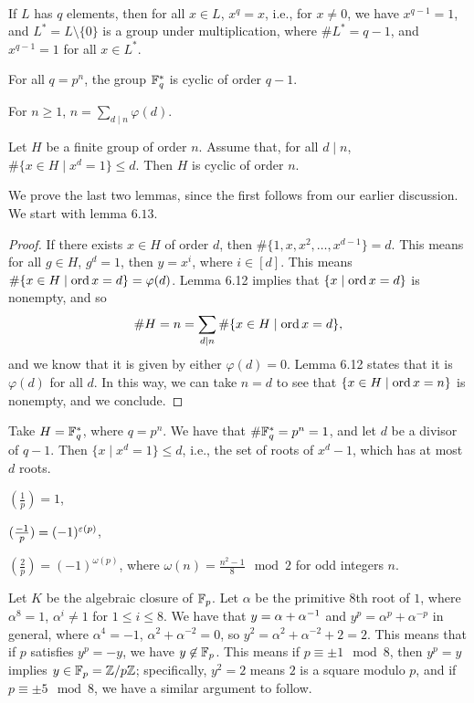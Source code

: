 \\[8pt]
If $L$ has $q$ elements, then for all $x \in L$, $x^q = x$, i.e., for $x \neq 0$, we have $x^{q-1} = 1$, and $L^\ast = L \setminus \{0\}$ is a group under multiplication, where $\# L^\ast = q - 1$, and $x^{q-1} = 1$ for all $x \in L^\ast$.
\begin{lemma}
    For all $q = p^n$, the group $\mathbb F_q^\ast$ is cyclic of order $q - 1$.
\end{lemma}
\begin{lemma}
    For $n \geq 1$, $n = \sum_{d \mid n} \varphi(d)$.
\end{lemma}
\begin{lemma}
    Let $H$ be a finite group of order $n$. Assume that, for all $d \mid n$, $\# \{x \in H \mid x^d = 1\} \leq d$. Then $H$ is cyclic of order $n$.
\end{lemma}
\noindent We prove the last two lemmas, since the first follows from our earlier discussion. We start with lemma $6.13$.
\begin{proof}
    If there exists $x \in H$ of order $d$, then $\#\{1, x, x^2, \dots, x^{d-1}\} = d$. This means for all $g \in H$, $g^d = 1$, then $y = x^i$, where $i \in [d]$. This means $\#\{x \in H \mid \operatorname{ord} x = d\} = \varphi(d)$. Lemma 6.12 implies that $\{x \mid \operatorname{ord} x = d\}$ is nonempty, and so
    \[ \#H = n = \sum_{d \mid n} \#\{x \in H \mid \operatorname{ord} x = d \}, \]
    and we know that it is given by either $\varphi(d) = 0$. Lemma 6.12 states that it is $\varphi(d)$ for all $d$. In this way, we can take $n = d$ to see that $\{x \in H \mid \operatorname{ord} x = n\}$ is nonempty, and we conclude.
\end{proof}
\noindent Take $H = \mathbb F_q^\ast$, where $q = p^n$. We have that $\# \mathbb F_q^\ast = p^n = 1$, and let $d$ be a divisor of $q - 1$. Then $\{x \mid x^d = 1\} \leq d$, i.e., the set of roots of $x^d - 1$, which has at most $d$ roots.
\begin{lemma}
    \begin{parlist}
        \item $(\frac{1}{p}) = 1$,
        \item $(\frac{-1}{p}) = (-1)^{\varepsilon (p)}$,
        \item $(\frac{2}{p}) = (-1)^{\omega (p)}$, where $\omega(n) = \frac{n^2 - 1}{8} \mod 2$ for odd integers $n$. 
    \end{parlist}
\end{lemma}
\noindent Let $K$ be the algebraic closure of $\mathbb F_p$. Let $\alpha$ be the primitive $8$th root of $1$, where $\alpha^8 = 1$, $\alpha^i \neq 1$ for $1 \leq i \leq 8$. We have that $y = \alpha + \alpha^{-1}$ and $y^p = \alpha^p + \alpha^{-p}$ in general, where $\alpha^4 = -1$, $\alpha^2 + \alpha^{-2} = 0$, so $y^2 = \alpha^2 + \alpha^{-2} + 2 = 2$. This means that if $p$ satisfies $y^p = -y$, we have $y \not\in \mathbb F_p$. This means if $p \equiv \pm 1 \mod 8$, then $y^p = y$ implies $y \in \mathbb F_p = \mathbb Z/p\mathbb Z$; specifically, $y^2 = 2$ means $2$ is a square modulo $p$, and if $p \equiv \pm 5 \mod 8$, we have a similar argument to follow.